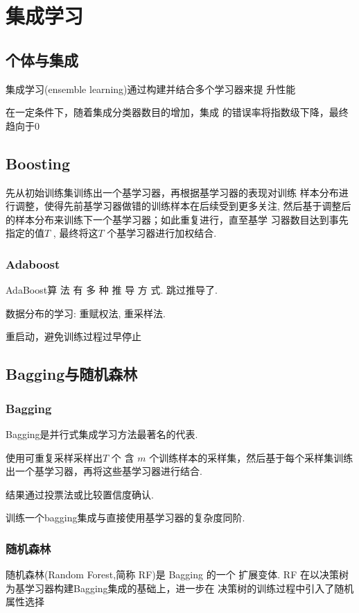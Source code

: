 \newpage
\section{集成学习}

\subsection{个体与集成}
集成学习(ensemble learning)通过构建并结合多个学习器来提
升性能

在一定条件下，随着集成分类器数目的增加，集成
的错误率将指数级下降，最终趋向于0


\subsection{Boosting}
先从初始训练集训练出一个基学习器，再根据基学习器的表现对训练
样本分布进行调整，使得先前基学习器做错的训练样本在后续受到更多关注,
然后基于调整后的样本分布来训练下一个基学习器；如此重复进行，直至基学
习器数目达到事先指定的值$T$ , 最终将这$T$ 个基学习器进行加权结合.
\subsubsection{Adaboost}
AdaBoost算 法 有 多 种 推 导 方 式. 跳过推导了. 

数据分布的学习: 重赋权法, 重采样法. 

重启动，避免训练过程过早停止

\subsection{Bagging与随机森林}
\subsubsection{Bagging}
Bagging是并行式集成学习方法最著名的代表. 

使用可重复采样采样出$T$ 个 含 $m$ 个训练样本的采样集，然后基于每个采样集训练出一个基学习器，再将这些基学习器进行结合.

结果通过投票法或比较置信度确认. 

训练一个bagging集成与直接使用基学习器的复杂度同阶. 

\subsubsection{随机森林}
随机森林(Random Forest,简称 RF)是 Bagging 的一个
扩展变体. RF 在以决策树为基学习器构建Bagging集成的基础上，进一步在
决策树的训练过程中引入了随机属性选择

